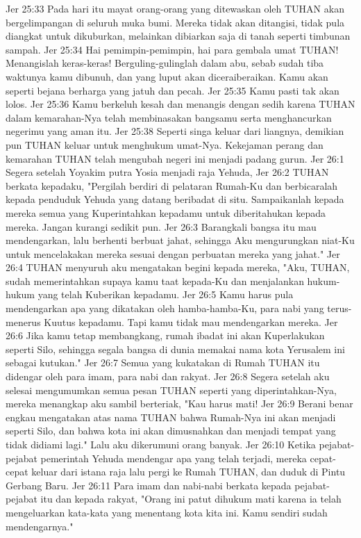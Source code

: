 Jer 25:33  Pada hari itu mayat orang-orang yang ditewaskan oleh TUHAN akan bergelimpangan di seluruh muka bumi. Mereka tidak akan ditangisi, tidak pula diangkat untuk dikuburkan, melainkan dibiarkan saja di tanah seperti timbunan sampah.
Jer 25:34  Hai pemimpin-pemimpin, hai para gembala umat TUHAN! Menangislah keras-keras! Berguling-gulinglah dalam abu, sebab sudah tiba waktunya kamu dibunuh, dan yang luput akan diceraiberaikan. Kamu akan seperti bejana berharga yang jatuh dan pecah.
Jer 25:35  Kamu pasti tak akan lolos.
Jer 25:36  Kamu berkeluh kesah dan menangis dengan sedih karena TUHAN dalam kemarahan-Nya telah membinasakan bangsamu serta menghancurkan negerimu yang aman itu.
Jer 25:38  Seperti singa keluar dari liangnya, demikian pun TUHAN keluar untuk menghukum umat-Nya. Kekejaman perang dan kemarahan TUHAN telah mengubah negeri ini menjadi padang gurun.
Jer 26:1  Segera setelah Yoyakim putra Yosia menjadi raja Yehuda,
Jer 26:2  TUHAN berkata kepadaku, "Pergilah berdiri di pelataran Rumah-Ku dan berbicaralah kepada penduduk Yehuda yang datang beribadat di situ. Sampaikanlah kepada mereka semua yang Kuperintahkan kepadamu untuk diberitahukan kepada mereka. Jangan kurangi sedikit pun.
Jer 26:3  Barangkali bangsa itu mau mendengarkan, lalu berhenti berbuat jahat, sehingga Aku mengurungkan niat-Ku untuk mencelakakan mereka sesuai dengan perbuatan mereka yang jahat."
Jer 26:4  TUHAN menyuruh aku mengatakan begini kepada mereka, "Aku, TUHAN, sudah memerintahkan supaya kamu taat kepada-Ku dan menjalankan hukum-hukum yang telah Kuberikan kepadamu.
Jer 26:5  Kamu harus pula mendengarkan apa yang dikatakan oleh hamba-hamba-Ku, para nabi yang terus-menerus Kuutus kepadamu. Tapi kamu tidak mau mendengarkan mereka.
Jer 26:6  Jika kamu tetap membangkang, rumah ibadat ini akan Kuperlakukan seperti Silo, sehingga segala bangsa di dunia memakai nama kota Yerusalem ini sebagai kutukan."
Jer 26:7  Semua yang kukatakan di Rumah TUHAN itu didengar oleh para imam, para nabi dan rakyat.
Jer 26:8  Segera setelah aku selesai mengumumkan semua pesan TUHAN seperti yang diperintahkan-Nya, mereka menangkap aku sambil berteriak, "Kau harus mati!
Jer 26:9  Berani benar engkau mengatakan atas nama TUHAN bahwa Rumah-Nya ini akan menjadi seperti Silo, dan bahwa kota ini akan dimusnahkan dan menjadi tempat yang tidak didiami lagi." Lalu aku dikerumuni orang banyak.
Jer 26:10  Ketika pejabat-pejabat pemerintah Yehuda mendengar apa yang telah terjadi, mereka cepat-cepat keluar dari istana raja lalu pergi ke Rumah TUHAN, dan duduk di Pintu Gerbang Baru.
Jer 26:11  Para imam dan nabi-nabi berkata kepada pejabat-pejabat itu dan kepada rakyat, "Orang ini patut dihukum mati karena ia telah mengeluarkan kata-kata yang menentang kota kita ini. Kamu sendiri sudah mendengarnya."
